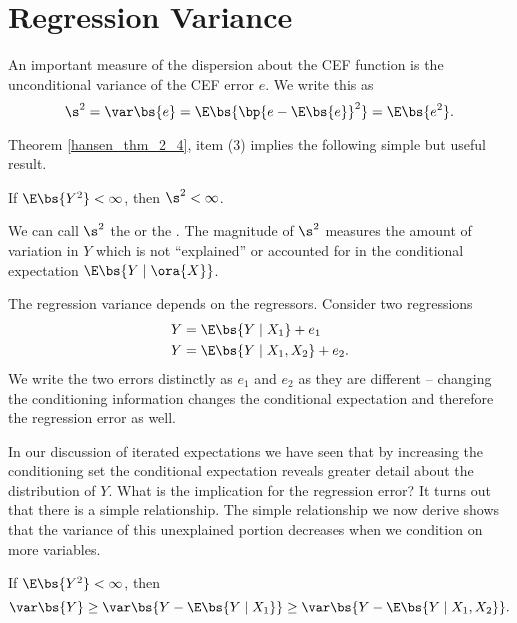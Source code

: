 \section{Regression Variance}

An important measure of the dispersion about the CEF function is the unconditional variance of the CEF error $e$. We write this as 
\begin{equation}
    \notag
    \s^2 = \var\bs{e} = \E\bs{\bp{e - \E\bs{e}}^2} = \E\bs{e^2}.
\end{equation}

Theorem \ref{hansen_thm_2_4}, item (3) implies the following simple but useful result.
\begin{theorem}
    \label{hansen_thm_2_5}
    If $\E\bs{Y^2}<\infty$, then $\s^2 < \infty$.
\end{theorem}

We can call $\s^2$ the  or the . The magnitude of $\s^2$ measures the amount of variation in $Y$ which is not ``explained'' or accounted for in the conditional expectation $\E\bs{Y \mid \ora{X}}$.

The regression variance depends on the regressors. Consider two regressions 
\begin{equation}
    \notag
    \begin{aligned}
        & Y = \E\bs{Y \mid X_1} + e_1 \\
        & Y = \E\bs{Y \mid X_1, X_2} + e_2 .
    \end{aligned}
\end{equation}
We write the two errors distinctly as $e_1$ and $e_2$ as they are different -- changing the conditioning information changes the conditional expectation and therefore the regression error as well.

In our discussion of iterated expectations we have seen that by increasing the conditioning set the conditional expectation reveals greater detail about the distribution of $Y$. What is the implication for the regression error? It turns out that there is a simple relationship. The simple relationship we now derive shows that the variance of this unexplained portion decreases when we condition on more variables. 

\begin{theorem}
    \label{hansen_thm_2_6}
    If $\E\bs{Y^2}<\infty$, then 
    \begin{equation}
        \notag
        \var\bs{Y} \geq \var\bs{Y - \E\bs{Y \mid X_1}} \geq \var\bs{Y - \E\bs{Y \mid X_1, X_2}}.
    \end{equation}
\end{theorem}

